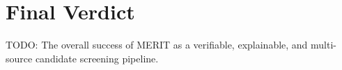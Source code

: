 \section{Final Verdict}

TODO: The overall success of MERIT as a verifiable, explainable, and multi-source candidate screening pipeline.
